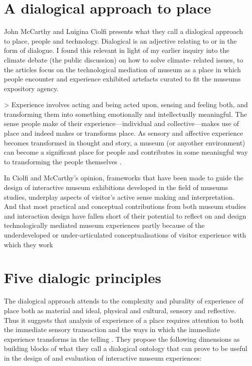 \section{A dialogical approach to place}
John McCarthy and Luigina Ciolfi presents what they call a dialogical approach to place, people and technology. Dialogical is an adjective relating to or in the form of dialogue. I found this relevant in light of my earlier inquiry into the climate debate (the public discussion) on how to solve climate- related issues, to the articles focus on the technological mediation of museum as a place in which people encounter and experience exhibited artefacts curated to fit the museums expository agency.

> Experience involves acting and being acted upon, sensing and feeling both, and transforming them into something emotionally and intellectually meaningful. The sense people make of their experience—individual and collective—makes use of place and indeed makes or transforms place. As sensory and affective experience becomes transformed in thought and story, a museum (or anyother environment) can become a significant place for people and contributes in some meaningful way to transforming the people themselves \autocite[p. 250]{mccarthy_place}.

In Ciolfi and McCarthy’s opinion, frameworks that have been made to guide the design of interactive museum exhibitions developed in the field of museums studies, underplay aspects of visitor’s active sense making and interpretation. And that most practical and conceptual contributions from both museum studies and interaction design have fallen short of their potential to reflect on and design technologically mediated museum experiences partly because of the underdeveloped or under-articulated conceptualisations of visitor experience with which they work \autocite[p. 248]{mccarthy_place}


\section{Five dialogic principles}
The dialogical approach attends to the complexity and plurality of experience of place both as material and ideal, physical and cultural, sensory and reflective. Thus it suggests that analysis of experience of a place requires attention to both the immediate sensory transaction and the ways in which the immediate experience transforms in the telling \autocite[p. 251]{mccarthy_place}. They propose the following dimensions as building blocks of what they call a dialogical ontology that can prove to be useful in the design of and evaluation of interactive museum experiences:

